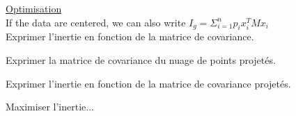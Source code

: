 \underline{Optimisation} \\

If the data are centered, we can also write $I_g = \Sigma_{i=1}^n p_i x_i^T M x_i$ \\

Exprimer l'inertie en fonction de la matrice de covariance.

Exprimer la matrice de covariance du nuage de points projetés.

Exprimer l'inertie en fonction de la matrice de covariance projetés.

Maximiser l'inertie...

\vspace{5mm}